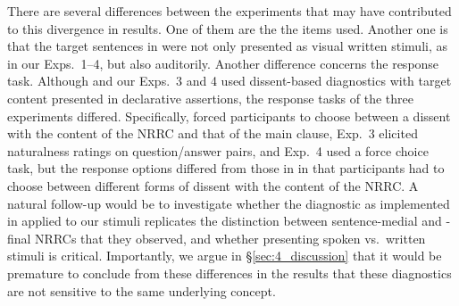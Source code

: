 \documentclass[times,linguex]{glossa}
\begin{document}
There are several differences between the experiments that may have contributed to this divergence in results. One of them are the the items used. Another one is that the target sentences in \citealt[Exp.~2]{syrett_experimental_2015} were not only presented as visual written stimuli, as in our Exps.~1--4, but also auditorily. Another difference concerns the response task. Although \citealt[Exp.~2]{syrett_experimental_2015}  and our Exps.~3 and 4 used dissent-based diagnostics with target content presented in declarative assertions, the response tasks of the three experiments differed. Specifically, \citealt[Exp.~2]{syrett_experimental_2015} forced participants to choose between a dissent with the content of the NRRC and that of the main clause, Exp.~3 elicited naturalness ratings on question/answer pairs, and Exp.~4 used a force choice task, but the response options differed  from those in \citealt{syrett_experimental_2015} in that participants had to choose between different forms of dissent with the content of the NRRC. %
A natural follow-up would be to investigate whether the diagnostic as implemented in \citealt[Exp.~2]{syrett_experimental_2015} applied to our stimuli replicates the distinction between sentence-medial and -final NRRCs that they observed, and whether presenting spoken vs.~written stimuli is critical. Importantly, we argue in \S\ref{sec:4_discussion} that it would be premature to conclude from these differences in the results that these diagnostics are not sensitive to the same underlying concept.
\end{document}
